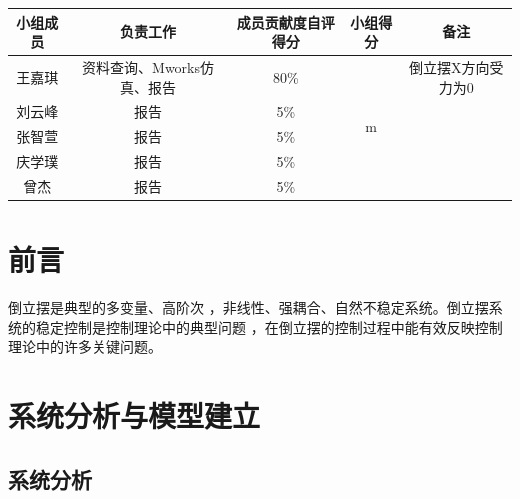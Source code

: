 \documentclass{ctexart}
\begin{document}
	
	\begin{table}[H]
		\centering
		\begin{tabular}{c|c|c|c|c}
			\hline
			小组成员 & 负责工作  & 成员贡献度自评得分&小组得分 & 备注\\
			\hline
			王嘉琪 & 资料查询、Mworks仿真、报告 & 80\% & \multirow{5}{*}{m}&倒立摆X方向受力为0\\
			\hline
			刘云峰 & 报告 & 5\% & &\\
			\hline
			张智萱 & 报告 & 5\% & &\\
			\hline
			庆学璞 & 报告 & 5\% & &\\
			\hline
			曾杰 & 报告 & 5\% & &\\
			\hline
		\end{tabular}
	\end{table}
	\newpage
	\tableofcontents
	\newpage
	\section{前言}
		倒立摆是典型的多变量、高阶次 ，非线性、强耦合、自然不稳定系统。倒立摆系统的稳定控制是控制理论中的典型问题 ，在倒立摆的控制过程中能有效反映控制理论中的许多关键问题。
	\section{系统分析与模型建立}
		\subsection{系统分析}
\end{document}
